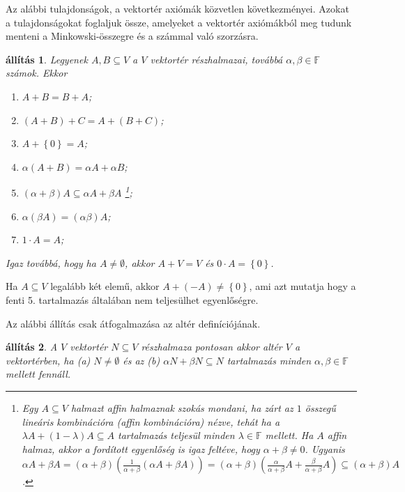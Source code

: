\documentclass[9pt, a4paper, showtrims]{memoir}
\theoremstyle{plain}
\newtheorem{proposition}{állítás}[chapter]
\theoremstyle{remark}
\theoremstyle{definition}
\begin{document}
Az alábbi tulajdonságok, a vektortér axiómák közvetlen következményei.
Azokat a tulajdonságokat foglaljuk össze, amelyeket a vektortér axiómákból meg tudunk menteni
a Minkowski-összegre és a számmal való szorzásra.
\begin{proposition}\label{pr:Minkowski}
	Legyenek $A,B\subseteq V$ a $V$ vektortér részhalmazai,
	továbbá $\alpha,\beta\in\mathbb{F}$ számok.
	Ekkor
	\begin{enumerate}
		\item $A+B=B+A$;
		\item $\left( A+B \right)+C=A+\left( B+C \right)$;
		\item $A+\left\{ 0 \right\}=A$;
		\item $\alpha\left( A+B \right)=\alpha A+\alpha B$;
		\item $\left( \alpha+\beta \right) A\subseteq \alpha A+\beta A$%
		      \footnote{
			      Egy $A\subseteq V$ halmazt \emph{affin halmaznak}
			      szokás mondani,
			      ha zárt az $1$ összegű lineáris kombinációra
			      (\emph{affin kombinációra})
			      nézve,
			      tehát ha a $\lambda A+\left( 1-\lambda \right)A\subseteq A$
			      tartalmazás teljesül minden $\lambda\in\mathbb{F}$
			      mellett.
			      Ha $A$ affin halmaz,
			      akkor a fordított egyenlőség is igaz feltéve, hogy $\alpha+\beta\neq 0$.
			      Ugyanis
			      $\alpha A+\beta A
				      =
				      \left( \alpha+\beta \right)\left( \frac{1}{\alpha+\beta}\left( \alpha A+\beta A \right) \right)
				      =
				      \left( \alpha+\beta \right)\left( \frac{\alpha}{\alpha+\beta}A+\frac{\beta}{\alpha+\beta}A \right)
				      \subseteq
				      \left( \alpha+\beta \right)A$.
		      };
		\item $\alpha\left( \beta A \right)=\left( \alpha\beta \right)A$;
		\item $1\cdot A=A$;
	\end{enumerate}
	Igaz továbbá, hogy ha $A\neq \emptyset$, akkor $A+V=V$ és $0\cdot A=\left\{ 0 \right\}$.
\end{proposition}
Ha $A\subseteq V$ legalább két elemű,
akkor $A+\left( -A \right)\neq\left\{ 0 \right\}$, ami azt mutatja hogy a fenti 5. tartalmazás
általában nem teljesülhet egyenlőségre.

Az alábbi állítás csak átfogalmazása az altér definíciójának.
\begin{proposition}
	A $V$ vektortér $N\subseteq V$ részhalmaza pontosan akkor altér $V$ a vektortérben,
	ha
	(a) $N\neq \emptyset$ és az
	(b) $\alpha N+\beta N\subseteq N$ tartalmazás minden $\alpha,\beta\in\mathbb{F}$
	mellett fennáll.
\end{proposition}
\end{document}
